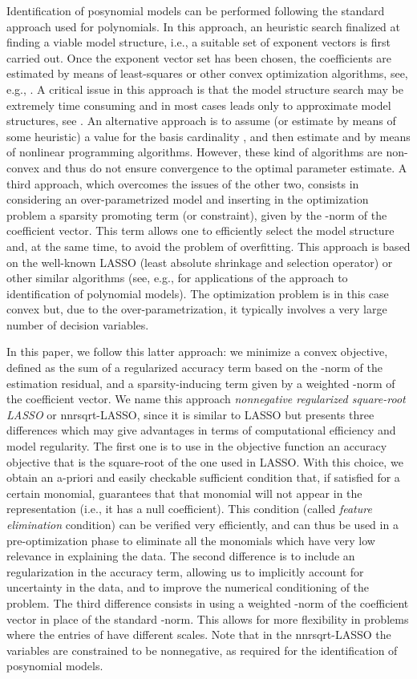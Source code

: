 \documentclass[11pt]{article}
\begin{document}
Identification of posynomial models can be performed following the
standard approach used for polynomials. In this approach, an heuristic
search finalized at finding a viable model structure, i.e., a suitable
set of exponent vectors  is first carried
out. Once the exponent vector set has been chosen, the coefficients
 are estimated by means of least-squares or other convex optimization
algorithms, see, e.g., \cite{SpPiLo06,PuPi07,DaGiSa03}. A critical
issue in this approach is that the model structure search may be extremely
time consuming and in most cases leads only to approximate model structures,
see \cite{MiNoAUT04}. An alternative approach is to assume (or estimate
by means of some heuristic) a value  for the basis cardinality
, and then estimate  and  by means of
nonlinear programming algorithms. However, these kind of algorithms
are non-convex and thus do not ensure convergence to the optimal parameter
estimate. A third approach, which overcomes the issues of the other
two, consists in considering an over-parametrized model and inserting
in the optimization problem a sparsity promoting term (or constraint),
given by the -norm of the coefficient vector. This term
allows one to efficiently select the model structure and, at the same
time, to avoid the problem of overfitting. This approach is based
on the well-known LASSO (least absolute shrinkage and selection operator)
or other similar algorithms (see, e.g., \cite{Tib96,KuLoBr06,BoSePi10,NoTAC12}
for applications of the approach to identification of polynomial models).
The optimization problem is in this case convex but, due to the over-parametrization,
it typically involves a very large number of decision variables.

In this paper, we follow this latter approach: we minimize a convex
objective, defined as the sum of a regularized accuracy term based
on the -norm of the estimation residual, and a sparsity-inducing
term given by a weighted -norm of the coefficient vector.
We name this approach \emph{nonnegative regularized square-root LASSO}
or nnrsqrt-LASSO, since it is similar to LASSO but presents three
differences which may give advantages in terms of computational efficiency
and model regularity. The first one is to use in the objective function
an accuracy objective that is the square-root of the one used in LASSO.
With this choice, we obtain an a-priori and easily checkable sufficient condition
that, if satisfied for a certain monomial, guarantees that that monomial
will not appear in the representation (i.e., it has a null coefficient). 
This condition (called \emph{feature elimination} condition) can be
verified very efficiently, and can thus be used in a pre-optimization
phase to eliminate all the monomials which have very low relevance
in explaining the data. The second difference is to include an 
regularization in the accuracy term, allowing us to implicitly account for uncertainty
in the data, and to improve the numerical conditioning of the problem. 
The third difference
consists in using a weighted -norm of the coefficient vector
in place of the standard -norm. This allows for more flexibility
in problems where the entries of  have different scales. Note
that in the nnrsqrt-LASSO the variables are constrained to be nonnegative,
as required for the identification of posynomial models.
\end{document}
